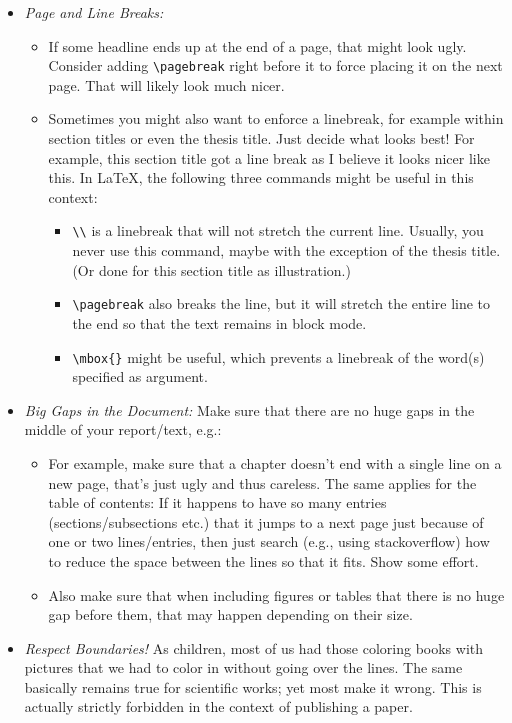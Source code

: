 \begin{itemize}
  \item \emph{Page and Line Breaks:} 
  \begin{itemize}
    \item If some headline ends up at the end of a page, that might look ugly. Consider adding \verb!\pagebreak! right before it to force placing it on the next page. That will likely look much nicer. 
    \item Sometimes you might also want to enforce a linebreak, for example within section titles or even the thesis title. Just decide what looks best! For example, this section title got a line break as I believe it looks nicer like this. In \LaTeX{}, the following three commands might be useful in this context:
    \begin{itemize}
      \item \verb!\\! is a linebreak that will not stretch the current line. Usually, you never use this command, maybe with the exception of the thesis title. (Or done for this section title as illustration.)
      \item \verb!\pagebreak! also breaks the line, but it will stretch the entire line to the end so that the text remains in block mode.
      \item \verb!\mbox{}! might be useful, which prevents a linebreak of the word(s) specified as argument.
    \end{itemize}
  \end{itemize}
  \item \emph{Big Gaps in the Document:} Make sure that there are no huge gaps in the middle of your report/text, e.g.:
  \begin{itemize}
    \item For example, make sure that a chapter doesn't end with a single line on a new page, that's just ugly and thus careless. The same applies for the table of contents: If it happens to have so many entries (sections/subsections etc.) that it jumps to a next page just because of one or two lines/entries, then just search (e.g., using stackoverflow) how to reduce the space between the lines so that it fits. Show some effort.
    \item Also make sure that when including figures or tables that there is no huge gap before them, that may happen depending on their size.
  \end{itemize}
  \item \emph{Respect Boundaries!} As children, most of us had those coloring books with pictures that we had to color in without going over the lines. The same basically remains true for scientific works; yet most make it wrong. This is actually strictly forbidden in the context of publishing a paper.

\end{itemize}
